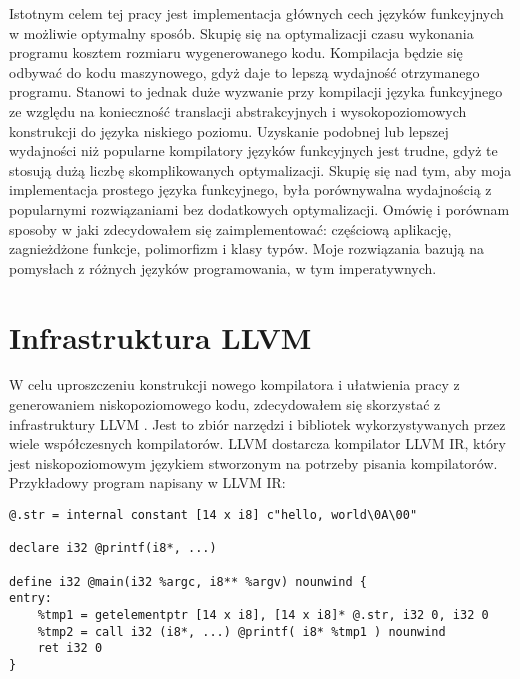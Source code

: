 \documentclass[declaration,shortabstract]{iithesis}
\begin{document}
Istotnym celem tej pracy jest implementacja głównych cech języków funkcyjnych w
możliwie optymalny sposób. Skupię się na optymalizacji czasu wykonania 
programu kosztem rozmiaru wygenerowanego kodu. Kompilacja będzie się odbywać 
do kodu maszynowego, gdyż daje to lepszą wydajność otrzymanego programu. 
Stanowi to jednak duże wyzwanie przy kompilacji języka funkcyjnego ze względu 
na konieczność translacji abstrakcyjnych i wysokopoziomowych konstrukcji do 
języka niskiego poziomu. Uzyskanie 
podobnej lub lepszej wydajności niż popularne kompilatory języków funkcyjnych
jest trudne,
gdyż te stosują dużą liczbę skomplikowanych optymalizacji. Skupię się nad tym, 
aby moja implementacja prostego języka funkcyjnego, była porównywalna 
wydajnością 
z popularnymi rozwiązaniami bez dodatkowych optymalizacji. Omówię i porównam 
sposoby w jaki zdecydowałem się 
zaimplementować:
częściową aplikację, zagnieżdżone funkcje, polimorfizm i klasy typów. Moje 
rozwiązania bazują na pomysłach z różnych języków programowania, w tym 
imperatywnych. 

\section{Infrastruktura LLVM}




W celu uproszczeniu konstrukcji nowego kompilatora i ułatwienia pracy z 
generowaniem niskopoziomowego kodu, 
zdecydowałem się skorzystać z infrastruktury LLVM \cite{llvm}. 
Jest to zbiór narzędzi i bibliotek wykorzystywanych przez wiele współczesnych 
kompilatorów. LLVM dostarcza kompilator LLVM IR, który jest niskopoziomowym 
językiem stworzonym na potrzeby pisania 
kompilatorów. Przykładowy program napisany w LLVM IR:

\renewcommand{\thelstlisting}{\thesection\arabic{lstlisting}}

\begin{lstlisting}[frame=lines]
@.str = internal constant [14 x i8] c"hello, world\0A\00"

declare i32 @printf(i8*, ...)

define i32 @main(i32 %argc, i8** %argv) nounwind {
entry:
    %tmp1 = getelementptr [14 x i8], [14 x i8]* @.str, i32 0, i32 0
    %tmp2 = call i32 (i8*, ...) @printf( i8* %tmp1 ) nounwind
    ret i32 0
}
\end{lstlisting}
\end{document}
